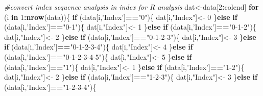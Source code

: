 \documentclass[]{article}
\newenvironment{Shaded}{\begin{snugshade}}{\end{snugshade}}
\newcommand{\KeywordTok}[1]{\textcolor[rgb]{0.13,0.29,0.53}{\textbf{#1}}}
\newcommand{\DecValTok}[1]{\textcolor[rgb]{0.00,0.00,0.81}{#1}}
\newcommand{\StringTok}[1]{\textcolor[rgb]{0.31,0.60,0.02}{#1}}
\newcommand{\CommentTok}[1]{\textcolor[rgb]{0.56,0.35,0.01}{\textit{#1}}}
\newcommand{\ControlFlowTok}[1]{\textcolor[rgb]{0.13,0.29,0.53}{\textbf{#1}}}
\newcommand{\OperatorTok}[1]{\textcolor[rgb]{0.81,0.36,0.00}{\textbf{#1}}}
\newcommand{\NormalTok}[1]{#1}
\begin{document}
\begin{Shaded}
\begin{Highlighting}[]
\CommentTok{#convert index sequence analysis in index for R analysis}
\NormalTok{dat<-data[}\DecValTok{2}\OperatorTok{:}\NormalTok{colend]}
\ControlFlowTok{for}\NormalTok{ (i }\ControlFlowTok{in} \DecValTok{1}\OperatorTok{:}\KeywordTok{nrow}\NormalTok{(data))\{ }
  \ControlFlowTok{if}\NormalTok{ (data[i,}\StringTok{'Index'}\NormalTok{]}\OperatorTok{==}\StringTok{"0"}\NormalTok{)\{ }
\NormalTok{    dat[i,}\StringTok{"Index"}\NormalTok{]<-}\StringTok{ }\DecValTok{0}
\NormalTok{  \}}\ControlFlowTok{else} \ControlFlowTok{if}\NormalTok{ (data[i,}\StringTok{'Index'}\NormalTok{]}\OperatorTok{==}\StringTok{"0-1"}\NormalTok{)\{}
\NormalTok{    dat[i,}\StringTok{"Index"}\NormalTok{]<-}\StringTok{ }\DecValTok{1}
\NormalTok{  \}}\ControlFlowTok{else} \ControlFlowTok{if}\NormalTok{ (data[i,}\StringTok{'Index'}\NormalTok{]}\OperatorTok{==}\StringTok{"0-1-2"}\NormalTok{)\{}
\NormalTok{    dat[i,}\StringTok{"Index"}\NormalTok{]<-}\StringTok{ }\DecValTok{2}
\NormalTok{  \}}\ControlFlowTok{else} \ControlFlowTok{if}\NormalTok{ (data[i,}\StringTok{'Index'}\NormalTok{]}\OperatorTok{==}\StringTok{"0-1-2-3"}\NormalTok{)\{}
\NormalTok{    dat[i,}\StringTok{"Index"}\NormalTok{]<-}\StringTok{ }\DecValTok{3}
\NormalTok{  \}}\ControlFlowTok{else} \ControlFlowTok{if}\NormalTok{ (data[i,}\StringTok{'Index'}\NormalTok{]}\OperatorTok{==}\StringTok{"0-1-2-3-4"}\NormalTok{)\{}
\NormalTok{    dat[i,}\StringTok{"Index"}\NormalTok{]<-}\StringTok{ }\DecValTok{4}
\NormalTok{  \}}\ControlFlowTok{else} \ControlFlowTok{if}\NormalTok{ (data[i,}\StringTok{'Index'}\NormalTok{]}\OperatorTok{==}\StringTok{"0-1-2-3-4-5"}\NormalTok{)\{}
\NormalTok{    dat[i,}\StringTok{"Index"}\NormalTok{]<-}\StringTok{ }\DecValTok{5}
\NormalTok{  \}}\ControlFlowTok{else} \ControlFlowTok{if}\NormalTok{ (data[i,}\StringTok{'Index'}\NormalTok{]}\OperatorTok{==}\StringTok{"1"}\NormalTok{)\{}
\NormalTok{    dat[i,}\StringTok{"Index"}\NormalTok{]<-}\StringTok{ }\DecValTok{1}
\NormalTok{  \}}\ControlFlowTok{else} \ControlFlowTok{if}\NormalTok{ (data[i,}\StringTok{'Index'}\NormalTok{]}\OperatorTok{==}\StringTok{"1-2"}\NormalTok{)\{}
\NormalTok{    dat[i,}\StringTok{"Index"}\NormalTok{]<-}\StringTok{ }\DecValTok{2}
\NormalTok{  \}}\ControlFlowTok{else} \ControlFlowTok{if}\NormalTok{ (data[i,}\StringTok{'Index'}\NormalTok{]}\OperatorTok{==}\StringTok{"1-2-3"}\NormalTok{)\{}
\NormalTok{    dat[i,}\StringTok{"Index"}\NormalTok{]<-}\StringTok{ }\DecValTok{3}
\NormalTok{  \}}\ControlFlowTok{else} \ControlFlowTok{if}\NormalTok{ (data[i,}\StringTok{'Index'}\NormalTok{]}\OperatorTok{==}\StringTok{"1-2-3-4"}\NormalTok{)\{}

\end{Highlighting}
\end{Shaded}
\end{document}
